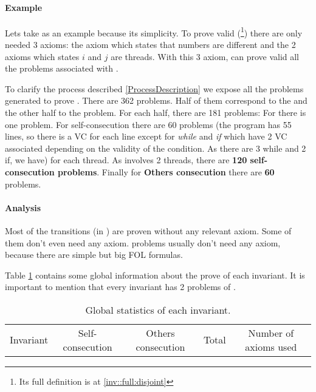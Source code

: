 \paragraph{Example}
Lets take \invDisjoint as an example because its simplicity.
%
To prove \invDisjoint valid
%
(\footnote{Its full definition is at \ref{inv::full:disjoint}})
%
there are only needed 3 axioms: the axiom which states that numbers are different and the 2 axioms which states $i$ and $j$ are threads. 
%
With this 3 axiom, \spass can prove valid all the \spass problems associated with \invDisjoint.


To clarify the process described  \ref{ProcessDescription} we expose all the \spass problems generated to prove \invDisjoint.
%
There are 362 \spass problems. Half of them correspond to the \reducedProblem and the other half to the \smallToBig problem.
%
For each half, there are 181 \spass problems:
%
For \textbf{\instantiation} there is one problem. 
%
For self-consecution there are 60 \spass problems (the program has 55 lines, so there is a \gls{VC} for each line except for \textit{while} and \textit{if} which have 2 \gls{VC} associated depending on the validity of the condition. As there are 3 while and 2 if, we have) for each thread. 
%
As \invDisjoint involves 2 threads, there are \textbf{120 self-consecution \spass problems}.
%
Finally for \textbf{Others consecution} there are \textbf{60} \spass problems.

\paragraph{Analysis}

Most of the transitions (\numTransitionsProvedWithPC in \numTotalTransitions) are proven without any relevant axiom. 
%
Some of them don't even need any axiom. 
%
\smallToBig problems usually don't need any axiom, because there are simple but big \gls{FOL} formulas.

Table \ref{table:analysisProofs}  contains some global information about the prove of each invariant.
%
It is important to mention that every invariant has 2 problems of \instantiation. 

\begin{table}[hbtp]
\centering
\begin{tabular}{ccccc}
Invariant & Self-consecution & Others consecution & Total & Number of axioms used\\

\end{tabular}
\label{table:analysisProofs}
\caption{Global statistics of each invariant.}
\end{table}


